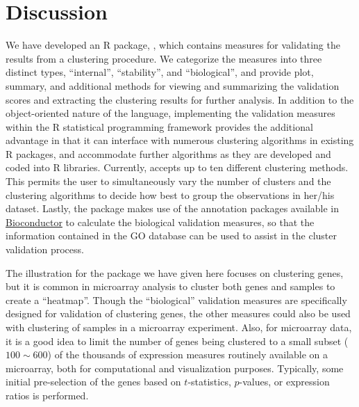 \documentclass[11pt]{article}
\begin{document}
\section{Discussion}
\label{sec:discussion}

We have developed an R package, , which contains measures
for validating the results from a clustering procedure.  We categorize
the measures into three distinct types, ``internal'', ``stability'',
and ``biological'', and provide plot, summary, and additional methods
for viewing and summarizing the validation scores and extracting the
clustering results for further analysis.  
In addition to the object-oriented nature of the language, 
implementing the validation measures
within the R statistical programming framework provides the additional
advantage in that it can 
interface with numerous clustering algorithms in existing R packages,
and accommodate further algorithms as they are developed and coded into
R libraries.  Currently,  accepts up to ten different
clustering methods.  This permits the user to simultaneously vary the
number of clusters and the clustering algorithms to decide how best to
group the observations in her/his dataset.  Lastly, the package makes
use of  the annotation packages
available in \href{http://www.bioconductor.org/}{Bioconductor} to
calculate the biological validation measures, so that the information
contained in the GO database can be used to assist in the cluster
validation process.


The illustration for the  package we have given
here focuses on clustering genes, but it is common in  microarray
analysis to cluster both genes and samples to create a ``heatmap''.
Though the ``biological'' validation measures are specifically
designed for validation of clustering genes, the other measures could
also be used with clustering of samples in a microarray experiment.
Also, for microarray data,  it is a good idea to limit the number of
genes being clustered to a small subset ($100\sim 600$) of the
thousands of expression measures routinely available on a microarray,
both for computational and visualization purposes.  Typically, some
initial pre-selection of the genes based on $t$-statistics,
$p$-values, or expression ratios is performed.
\end{document}
